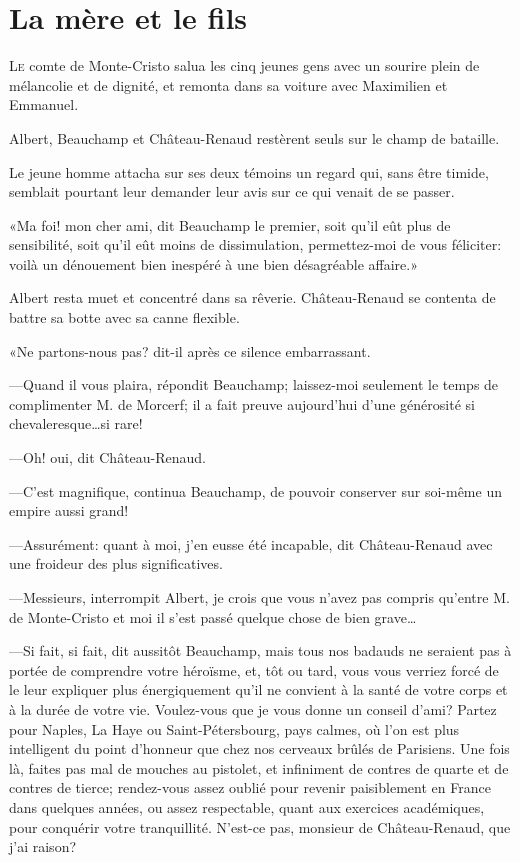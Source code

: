 \chapter{La mère et le fils}

\lettrine{L}{e} comte de Monte-Cristo salua les cinq jeunes gens avec un sourire plein de mélancolie et de dignité, et remonta dans sa voiture avec Maximilien et Emmanuel. 

\zz
Albert, Beauchamp et Château-Renaud restèrent seuls sur le champ de bataille. 

Le jeune homme attacha sur ses deux témoins un regard qui, sans être timide, semblait pourtant leur demander leur avis sur ce qui venait de se passer. 

«Ma foi! mon cher ami, dit Beauchamp le premier, soit qu'il eût plus de sensibilité, soit qu'il eût moins de dissimulation, permettez-moi de vous féliciter: voilà un dénouement bien inespéré à une bien désagréable affaire.» 

Albert resta muet et concentré dans sa rêverie. Château-Renaud se contenta de battre sa botte avec sa canne flexible. 

«Ne partons-nous pas? dit-il après ce silence embarrassant. 

—Quand il vous plaira, répondit Beauchamp; laissez-moi seulement le temps de complimenter M. de Morcerf; il a fait preuve aujourd'hui d'une générosité si chevaleresque\dots si rare! 

—Oh! oui, dit Château-Renaud. 

—C'est magnifique, continua Beauchamp, de pouvoir conserver sur soi-même un empire aussi grand! 

—Assurément: quant à moi, j'en eusse été incapable, dit Château-Renaud avec une froideur des plus significatives. 

—Messieurs, interrompit Albert, je crois que vous n'avez pas compris qu'entre M. de Monte-Cristo et moi il s'est passé quelque chose de bien grave\dots 

—Si fait, si fait, dit aussitôt Beauchamp, mais tous nos badauds ne seraient pas à portée de comprendre votre héroïsme, et, tôt ou tard, vous vous verriez forcé de le leur expliquer plus énergiquement qu'il ne convient à la santé de votre corps et à la durée de votre vie. Voulez-vous que je vous donne un conseil d'ami? Partez pour Naples, La Haye ou Saint-Pétersbourg, pays calmes, où l'on est plus intelligent du point d'honneur que chez nos cerveaux brûlés de Parisiens. Une fois là, faites pas mal de mouches au pistolet, et infiniment de contres de quarte et de contres de tierce; rendez-vous assez oublié pour revenir paisiblement en France dans quelques années, ou assez respectable, quant aux exercices académiques, pour conquérir votre tranquillité. N'est-ce pas, monsieur de Château-Renaud, que j'ai raison? 

